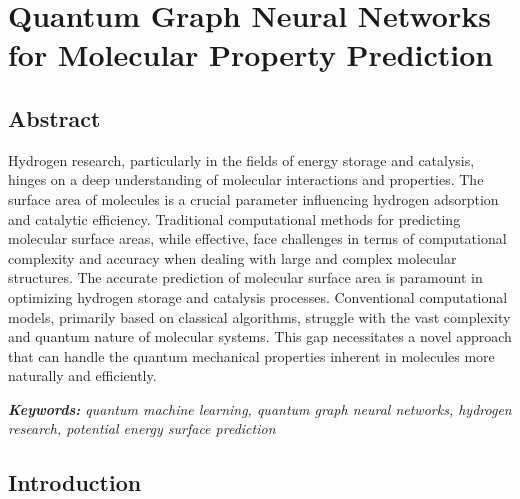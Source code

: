 \chapter{Quantum Graph Neural Networks for Molecular Property Prediction}

\section*{Abstract}

Hydrogen research, particularly in the fields of energy storage and catalysis, hinges on a deep understanding of molecular interactions and properties. The surface area of molecules is a crucial parameter influencing hydrogen adsorption and catalytic efficiency. Traditional computational methods for predicting molecular surface areas, while effective, face challenges in terms of computational complexity and accuracy when dealing with large and complex molecular structures. The accurate prediction of molecular surface area is paramount in optimizing hydrogen storage and catalysis processes. Conventional computational models, primarily based on classical algorithms, struggle with the vast complexity and quantum nature of molecular systems. This gap necessitates a novel approach that can handle the quantum mechanical properties inherent in molecules more naturally and efficiently.

\textit{\textbf{Keywords:} quantum machine learning, quantum graph neural networks, hydrogen research, potential energy surface prediction}

\section{Introduction}
\label{sec:introduction}

